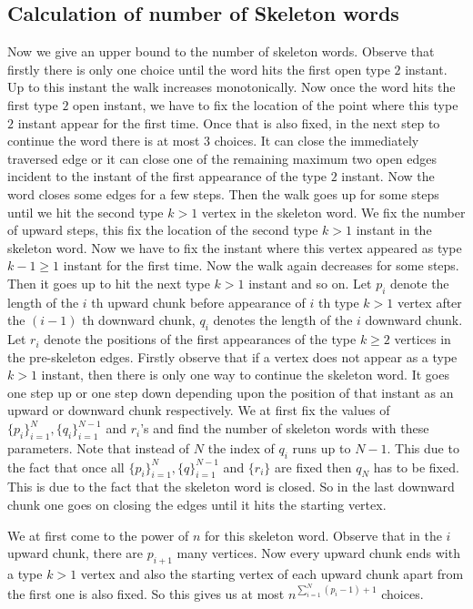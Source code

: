 \documentclass[12pt]{article}
\numberwithin{equation}{section}
\numberwithin{equation}{section}
\theoremstyle{definition}
\renewcommand{\1}{\bf 1}
\begin{document}
\subsection{Calculation of number of Skeleton words}\label{subsec:skeletonwordcount}
Now we give an upper bound to the number of skeleton words. Observe that firstly there is only one choice until the word hits the first open type $2$ instant. Up to this instant the walk increases monotonically. Now once the word hits the first type $2$ open instant, we have to fix the location of the point where this type $2$ instant appear for the first time. Once that is also fixed, in the next step to continue the word there is at most $3$ choices. It can close the immediately traversed edge or it can close one of the remaining maximum two open edges incident to the instant of the first appearance of the type $2$ instant. Now the word closes some edges for a few steps. Then the walk goes up for some steps until we hit the second type $k>1$ vertex in the skeleton word. We fix the number of upward steps, this fix the location of the second type $k>1$ instant in the skeleton word. Now we have to fix the instant where this vertex appeared as type $k-1\ge 1$ instant for the first time. Now the walk again decreases for some steps. Then it goes up to hit the next type $k>1$  instant and so on. Let $p_{i}$ denote the length of the $i$ th upward chunk before appearance of $i$ th type $k>1$ vertex after the $(i-1)$ th downward chunk, $q_{i}$ denotes the length of the $i$ downward chunk. Let $r_{i}$ denote the positions of the first appearances of the type $k\ge 2$ vertices in the pre-skeleton edges. 
Firstly observe that if a vertex does not appear as a type $k>1$ instant, then there is only one way to continue the skeleton word. It goes one step up or one step down depending upon the position of that instant as an upward or downward chunk respectively. We at first fix the values of $\{ p_{i} \}_{i=1}^{N}, \{ q_{i} \}_{i=1}^{N-1}$ and $r_{i}$'s and find the number of skeleton words with these parameters. Note that instead of $N$ the index of $q_{i}$ runs up to $N-1$. This due to the fact that once all $\{p_{i}\}_{i=1}^{N}, \{ q \}_{i=1}^{N-1}$ and $\{ r_{i} \}$ are fixed then $q_{N}$ has to be fixed. This is due to the fact that the skeleton word is closed. So in the last downward chunk one goes on closing the edges until it hits the starting vertex. 


We  at first come to the power of $n$ for this skeleton word. Observe that in the $i$ upward chunk, there are $p_{i+1}$ many vertices. Now every upward chunk ends with a type $k>1$ vertex and also the starting vertex of each upward chunk apart from the first one is also fixed. So this gives us at most $n^{\sum_{i=1}^{N}(p_{i}-1)+1}$ choices.
\end{document}
